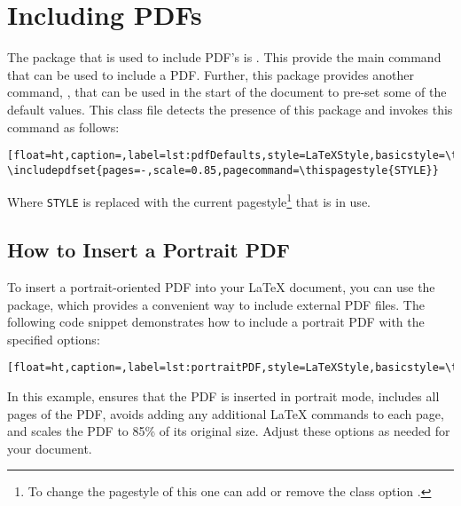 \chapter{Including PDFs}\label{sec:includingpdfs}
	
	The package that is used to include PDF's is .
	This provide the main command  that can be used to include a PDF.
	Further, this package provides another command, , that can be used in the start of the document to pre-set some of the default values.
	This class file detects the presence of this package and invokes this command as follows:
	
	\begin{lstlisting}[float=ht,caption=,label=lst:pdfDefaults,style=LaTeXStyle,basicstyle=\ttfamily,]
\includepdfset{pages=-,scale=0.85,pagecommand=\thispagestyle{STYLE}}
	\end{lstlisting}
	Where \texttt{STYLE} is replaced with the current pagestyle\footnote{To change the pagestyle of this one can add or remove the class option .} that is in use. 
	
	\section{How to Insert a Portrait PDF}
		To insert a portrait-oriented PDF into your LaTeX document, you can use the  package, which provides a convenient way to include external PDF files. 
		The following code snippet demonstrates how to include a portrait PDF with the specified options:

		\begin{lstlisting}[float=ht,caption=,label=lst:portraitPDF,style=LaTeXStyle,basicstyle=\ttfamily,]

		\end{lstlisting}

		In this example,  ensures that the PDF is inserted in portrait mode,  includes all pages of the PDF,  avoids adding any additional LaTeX commands to each page, and  scales the PDF to 85\% of its original size. 
		Adjust these options as needed for your document.

